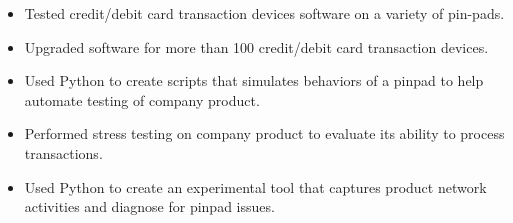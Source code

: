 \documentclass[10pt,a4paper]{altacv}
\begin{document}

\begin{fullwidth}
\makecvheader
\end{fullwidth}



\begin{itemize}
\item Tested credit/debit card transaction devices software on a variety of pin-pads.
\item Upgraded software for more than 100 credit/debit card transaction devices.
\end{itemize}

\divider

\begin{itemize}
\item Used Python to create scripts that simulates behaviors of a pinpad to help automate testing of company product.
\item Performed stress testing on company product to evaluate its ability to process transactions.
\item Used Python to create an experimental tool that captures product network activities and diagnose for pinpad issues.
\end{itemize}


\end{document}
